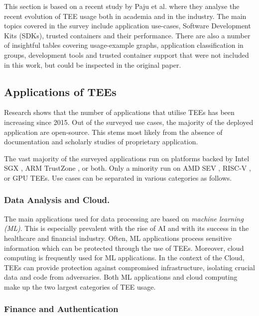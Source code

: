 \documentclass[runningheads,a4paper]{uwsese}
\begin{document}
This section is based on a recent study by Paju et al. \cite{tee_app_rev} where
they analyse the recent evolution of TEE usage both in academia and in the
industry. The main topics covered in the survey include application use-cases,
Software Development Kits (SDKs), trusted containers and their performance.
There are also a number of insightful tables covering usage-example graphs,
application classification in groups, development tools and trusted container
support that were not included in this work, but could be inspected in the
original paper.

\subsection{Applications of TEEs}

Research shows that the number of applications that utilise TEEs has been
increasing since 2015. Out of the surveyed use cases, the majority of the
deployed application are open-source. This stems most likely from the absence
of documentation and scholarly studies of proprietary application.

The vast majority of the surveyed applications run on platforms backed by Intel
SGX \cite{intel_sgx}, ARM TrustZone \cite{arm_tz}, or both. Only a minority run
on AMD SEV \cite{amd_sev}, RISC-V \cite{tee_keystone}, or GPU TEEs. Use cases
can be separated in various categories as follows.

\subsubsection{Data Analysis and Cloud.} 

The main applications used for data processing are based on \emph{machine
learning (ML)}. This is especially prevalent with the rise of AI and with its
success in the healthcare and financial industry. Often, ML applications
process sensitive information which can be protected through the use of TEEs.
Moreover, cloud computing is frequently used for ML applications. In the
context of the Cloud, TEEs can provide protection against compromised
infrastructure, isolating crucial data and code from adversaries. Both ML
applications and cloud computing make up the two largest categories of TEE
usage.

\subsubsection{Finance and Authentication}
\end{document}
